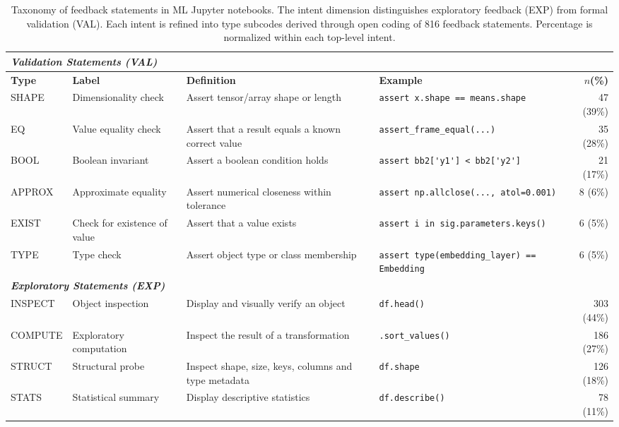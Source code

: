 \documentclass[a4paper,USenglish,cleveref,autoref,thm-restate,anonymous]{lipics-v2021}       %
\begin{document}
\begin{table}
  \centering
  \caption{Taxonomy of feedback statements in ML Jupyter notebooks.
  The intent dimension distinguishes exploratory feedback (EXP)
  from formal validation (VAL).
  Each intent is refined into type subcodes
  derived through open coding of 816 feedback statements.
  Percentage is normalized within each top-level intent.}\label{tab:taxonomy}
  \begin{tabularx}{\textwidth}{l p{2cm} X X r}
    \toprule
    \multicolumn{5}{l}{\emph{\textbf{Validation Statements (VAL)}}} \\
    \midrule
    \textbf{Type} &
    \textbf{Label} &
    \textbf{Definition} &
    \textbf{Example} &
    \textbf{$n$(\%)} \\
    \midrule
    SHAPE &
    Dimensionality check &
    Assert tensor/array shape or length &
    \lstinline{assert x.shape == means.shape} &
    47 (39\%) \\
    EQ &
    Value equality check &
    Assert that a result equals a known correct value &
    \lstinline{assert_frame_equal(...)} &
    35 (28\%) \\
    BOOL &
    Boolean invariant &
    Assert a boolean condition holds &
    \lstinline{assert bb2['y1'] < bb2['y2']} &
    21 (17\%) \\
    APPROX &
    Approximate equality &
    Assert numerical closeness within tolerance &
    \lstinline{assert np.allclose(..., atol=0.001)} &
    8 (6\%) \\
    EXIST &
    Check for existence of value &
    Assert that a value exists &
    \lstinline{assert i in sig.parameters.keys()} &
    6 (5\%) \\
    TYPE &
    Type check &
    Assert object type or class membership &
    \lstinline{assert type(embedding_layer) == Embedding} &
    6 (5\%) \\
    \midrule

    \multicolumn{5}{l}{\emph{\textbf{Exploratory Statements (EXP)}}} \\
    \midrule
    INSPECT &
    Object inspection &
    Display and visually verify an object &
    \lstinline{df.head()} &
    303 (44\%) \\
    COMPUTE &
    Exploratory computation &
    Inspect the result of a transformation &
    \lstinline{.sort_values()} &
    186 (27\%) \\
    STRUCT &
    Structural probe &
    Inspect shape, size, keys, columns and type metadata &
    \lstinline{df.shape} &
    126 (18\%) \\
    STATS &
    Statistical summary &
    Display descriptive statistics &
    \lstinline{df.describe()} &
    78 (11\%) \\
    \bottomrule
  \end{tabularx}
\end{table}
\end{document}
